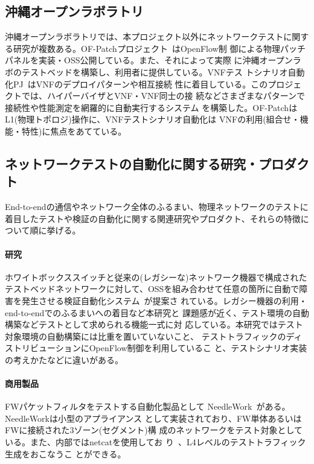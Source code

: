   \subsection{沖縄オープンラボラトリ}

沖縄オープンラボラトリでは、本プロジェクト以外にネットワークテストに関す
る研究が複数ある。OF-Patchプロジェクト~\cite{ool-testbedpj}はOpenFlow制
御による物理パッチパネルを実装・OSS公開している。また、それによって実際
に沖縄オープンラボのテストベッドを構築し、利用者に提供している。VNFテス
トシナリオ自動化PJ~\cite{ool-vnftestpj}はVNFのデプロイパターンや相互接続
性に着目している。このプロジェクトでは、ハイパーバイザとVNF・VNF同士の接
続などさまざまなパターンで接続性や性能測定を網羅的に自動実行するシステム
を構築した。OF-PatchはL1(物理トポロジ)操作に、VNFテストシナリオ自動化は
VNFの利用(組合せ・機能・特性)に焦点をあてている。

  \subsection{ネットワークテストの自動化に関する研究・プロダクト}
End-to-endの通信やネットワーク全体のふるまい、物理ネットワークのテストに
着目したテストや検証の自動化に関する関連研究やプロダクト、それらの特徴に
ついて順に挙げる。

    \paragraph{研究}
ホワイトボックススイッチと従来の(レガシーな)ネットワーク機器で構成された
テストベッドネットワークに対して、OSSを組み合わせて任意の箇所に自動で障
害を発生させる検証自動化システム~\cite{wbsw-oss-test-automation}が提案さ
れている。レガシー機器の利用・end-to-endでのふるまいへの着目など本研究と
課題感が近く、テスト環境の自動構築などテストとして求められる機能一式に対
応している。本研究ではテスト対象環境の自動構築には比重を置いていないこと、
テストトラフィックのディストリビューションにOpenFlow制御を利用しているこ
と、テストシナリオ実装の考えかたなどに違いがある。

    \paragraph{商用製品}
FWパケットフィルタをテストする自動化製品として
NeedleWork~\cite{needlework-web}がある。NeedleWorkは小型のアプライアンス
として実装されており、FW単体あるいはFWに接続された3ゾーン(セグメント)構
成のネットワークをテスト対象としている。また、内部ではnetcatを使用してお
り~\cite{needlework-slide}、L4レベルのテストトラフィック生成をおこなうこ
とができる。

